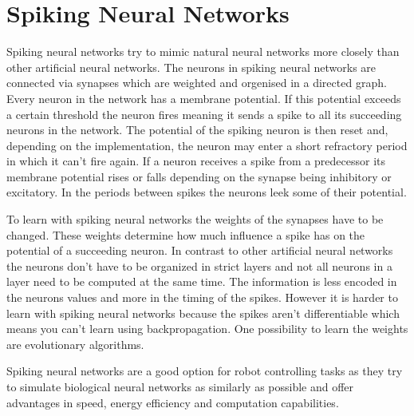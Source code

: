 \section{Spiking Neural Networks}
\label{sec:spiking}
Spiking neural networks try to mimic natural neural networks more closely than other artificial neural networks.
The neurons in spiking neural networks are connected via synapses which are weighted and orgenised in a directed graph.
Every neuron in the network has a membrane potential.
If this potential exceeds a certain threshold the neuron fires meaning it sends a spike to all its succeeding neurons in the network.
The potential of the spiking neuron is then reset and, depending on the implementation, the neuron may enter a short refractory period in which it can't fire again.
If a neuron receives a spike from a predecessor its membrane potential rises or falls depending on the synapse being inhibitory or excitatory.
In the periods between spikes the neurons leek some of their potential\cite{b1}.

To learn with spiking neural networks the weights of the synapses have to be changed.
These weights determine how much influence a spike has on the potential of a succeeding neuron.
In contrast to other artificial neural networks the neurons don't have to be organized in strict layers and not all neurons in a layer need to be computed at the same time.
The information is less encoded in the neurons values and more in the timing of the spikes\cite{b2}.
However it is harder to learn with spiking neural networks because the spikes aren't differentiable which means you can't learn using backpropagation.
One possibility to learn the weights are evolutionary algorithms.

Spiking neural networks are a good option for robot controlling tasks as they try to simulate biological neural networks as similarly as possible and offer advantages in speed, energy efficiency and computation capabilities\cite{b3}.